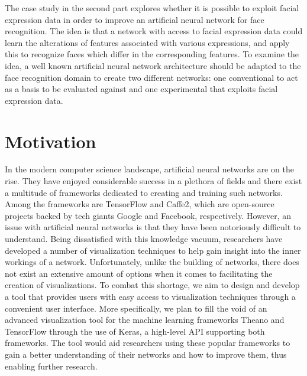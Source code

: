 \noindent The case study in the second part explores whether it is possible to exploit facial expression data in order to improve an artificial neural network for face recognition. The idea is that a network with access to facial expression data could learn the alterations of features associated with various expressions, and apply this to recognize faces which differ in the corresponding features. To examine the idea, a well known artificial neural network architecture should be adapted to the face recognition domain to create two different networks: one conventional to act as a basis to be evaluated against and one experimental that exploits facial expression data.\\

\section{Motivation}

\noindent In the modern computer science landscape, artificial neural networks are on the rise. They have enjoyed considerable success in a plethora of fields and there exist a multitude of frameworks dedicated to creating and training such networks. Among the frameworks are TensorFlow and Caffe2, which are open-source projects backed by tech giants Google and Facebook, respectively. However, an issue with artificial neural networks is that they have been notoriously difficult to understand. Being dissatisfied with this knowledge vacuum, researchers have developed a number of visualization techniques to help gain insight into the inner workings of a network. Unfortunately, unlike the building of networks, there does not exist an extensive amount of options when it comes to facilitating the creation of visualizations. To combat this shortage, we aim to design and develop a tool that provides users with easy access to visualization techniques through a convenient user interface. More specifically, we plan to fill the void of an advanced visualization tool for the machine learning frameworks Theano and TensorFlow through the use of Keras, a high-level API supporting both frameworks. The tool would aid researchers using these popular frameworks to gain a better understanding of their networks and how to improve them, thus enabling further research. \\


